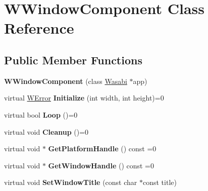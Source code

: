 \hypertarget{class_w_window_component}{}\section{W\+Window\+Component Class Reference}
\label{class_w_window_component}
\subsection*{Public Member Functions}
\begin{DoxyCompactItemize}
\item 
{\bfseries W\+Window\+Component} (class \hyperlink{class_wasabi}{Wasabi} $\ast$app)\hypertarget{class_w_window_component_a4e946f33342071109eca88c04250cfd5}{}\label{class_w_window_component_a4e946f33342071109eca88c04250cfd5}

\item 
virtual \hyperlink{class_w_error}{W\+Error} {\bfseries Initialize} (int width, int height)=0\hypertarget{class_w_window_component_a1cdf212fba0fbbad5e943f7882d1d307}{}\label{class_w_window_component_a1cdf212fba0fbbad5e943f7882d1d307}

\item 
virtual bool {\bfseries Loop} ()=0\hypertarget{class_w_window_component_aad32dea55ede4f41318fb767c3056a58}{}\label{class_w_window_component_aad32dea55ede4f41318fb767c3056a58}

\item 
virtual void {\bfseries Cleanup} ()=0\hypertarget{class_w_window_component_a812fe2b7b310029a0fca81b1986f3a6b}{}\label{class_w_window_component_a812fe2b7b310029a0fca81b1986f3a6b}

\item 
virtual void $\ast$ {\bfseries Get\+Platform\+Handle} () const  =0\hypertarget{class_w_window_component_ad72e37174037cf8ff53deaa09b36b94b}{}\label{class_w_window_component_ad72e37174037cf8ff53deaa09b36b94b}

\item 
virtual void $\ast$ {\bfseries Get\+Window\+Handle} () const  =0\hypertarget{class_w_window_component_ab729239f9a95e3e20c0bf0840e99d78f}{}\label{class_w_window_component_ab729239f9a95e3e20c0bf0840e99d78f}

\item 
virtual void {\bfseries Set\+Window\+Title} (const char $\ast$const title)\hypertarget{class_w_window_component_a6899c5a29153f3d5e8966b74c94128f1}{}\label{class_w_window_component_a6899c5a29153f3d5e8966b74c94128f1}


\end{DoxyCompactItemize}
